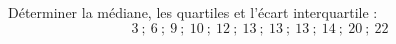 \begin{exo}
	Déterminer la médiane, les quartiles et l'écart interquartile :
	\[
		3 \ ; \ 6 \ ; \ 9 \ ; \ 10 \ ; \ 12 \ ; \ 13 \ ; \ 13 \ ; \ 13 \ ; \ 14 \ ; \ 20 \ ; \ 22
	\]
\end{exo}

